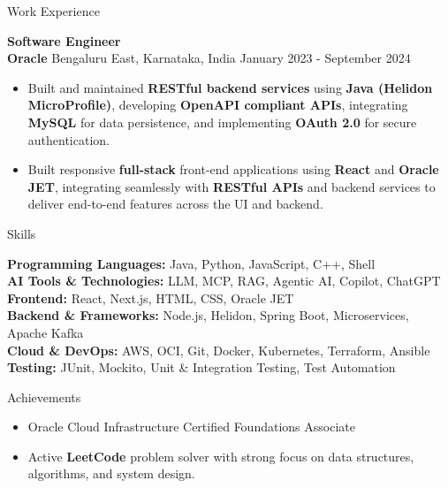 \documentclass{resume}
\begin{document}
\begin{rSection}{Work Experience}
\vspace{6pt}

\textbf{Software Engineer} \\
\textbf{Oracle} \textbar{} Bengaluru East, Karnataka, India \hspace*{\fill} January 2023 - September 2024
\vspace{-2pt}
\begin{itemize}
    \item Built and maintained \textbf{RESTful backend services} using \textbf{Java (Helidon MicroProfile)}, developing \textbf{OpenAPI compliant APIs}, integrating \textbf{MySQL} for data persistence, and implementing \textbf{OAuth 2.0} for secure authentication.
    \item Built responsive \textbf{full-stack} front-end applications using \textbf{React} and \textbf{Oracle JET}, integrating seamlessly with \textbf{RESTful APIs} and backend services to deliver end-to-end features across the UI and backend.
\end{itemize}

\end{rSection}

\begin{rSection}{Skills}

\vspace{-2pt}
\textbf{Programming Languages:} Java, Python, JavaScript, C++, Shell \\
\textbf{AI Tools \& Technologies:} LLM, MCP, RAG, Agentic AI, Copilot, ChatGPT \\
\textbf{Frontend:} React, Next.js, HTML, CSS, Oracle JET \\
\textbf{Backend \& Frameworks:} Node.js, Helidon, Spring Boot, Microservices, Apache Kafka \\
\textbf{Cloud \& DevOps:} AWS, OCI, Git, Docker, Kubernetes, Terraform, Ansible \\
\textbf{Testing:} JUnit, Mockito, Unit \& Integration Testing, Test Automation

\end{rSection}

\begin{rSection}{Achievements}

\begin{itemize}
    \item Oracle Cloud Infrastructure Certified Foundations Associate
    \item Active \textbf{LeetCode} problem solver with strong focus on data structures, algorithms, and system design.
\end{itemize}

\end{rSection}
\end{document}
